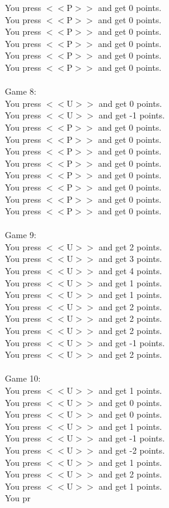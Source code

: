 \documentclass[pdflatex,sn-nature]{sn-jnl}%
\theoremstyle{thmstyleone}%
\theoremstyle{thmstyletwo}%
\theoremstyle{thmstylethree}%
\begin{document}
You press $<<$P$>>$ and get 0 points. $~$\\ 
You press $<<$P$>>$ and get 0 points. $~$\\ 
You press $<<$P$>>$ and get 0 points. $~$\\ 
You press $<<$P$>>$ and get 0 points. $~$\\ 
You press $<<$P$>>$ and get 0 points. $~$\\ 
You press $<<$P$>>$ and get 0 points. $~$\\ 
 $~$\\ 
Game 8: $~$\\ 
You press $<<$U$>>$ and get 0 points. $~$\\ 
You press $<<$U$>>$ and get -1 points. $~$\\ 
You press $<<$P$>>$ and get 0 points. $~$\\ 
You press $<<$P$>>$ and get 0 points. $~$\\ 
You press $<<$P$>>$ and get 0 points. $~$\\ 
You press $<<$P$>>$ and get 0 points. $~$\\ 
You press $<<$P$>>$ and get 0 points. $~$\\ 
You press $<<$P$>>$ and get 0 points. $~$\\ 
You press $<<$P$>>$ and get 0 points. $~$\\ 
You press $<<$P$>>$ and get 0 points. $~$\\ 
 $~$\\ 
Game 9: $~$\\ 
You press $<<$U$>>$ and get 2 points. $~$\\ 
You press $<<$U$>>$ and get 3 points. $~$\\ 
You press $<<$U$>>$ and get 4 points. $~$\\ 
You press $<<$U$>>$ and get 1 points. $~$\\ 
You press $<<$U$>>$ and get 1 points. $~$\\ 
You press $<<$U$>>$ and get 2 points. $~$\\ 
You press $<<$U$>>$ and get 2 points. $~$\\ 
You press $<<$U$>>$ and get 2 points. $~$\\ 
You press $<<$U$>>$ and get -1 points. $~$\\ 
You press $<<$U$>>$ and get 2 points. $~$\\ 
 $~$\\ 
Game 10: $~$\\ 
You press $<<$U$>>$ and get 1 points. $~$\\ 
You press $<<$U$>>$ and get 0 points. $~$\\ 
You press $<<$U$>>$ and get 0 points. $~$\\ 
You press $<<$U$>>$ and get 1 points. $~$\\ 
You press $<<$U$>>$ and get -1 points. $~$\\ 
You press $<<$U$>>$ and get -2 points. $~$\\ 
You press $<<$U$>>$ and get 1 points. $~$\\ 
You press $<<$U$>>$ and get 2 points. $~$\\ 
You press $<<$U$>>$ and get 1 points. $~$\\ 
You pr 
\end{document}
